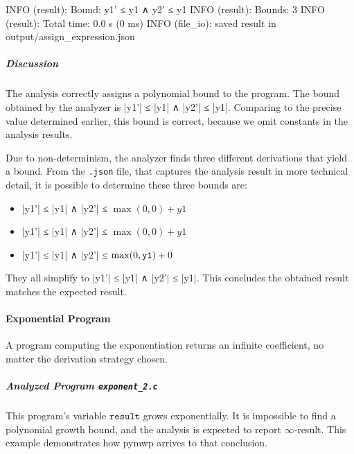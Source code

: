 \begin{outlisting}[label={lst:ex-output}]
INFO (result): Bound: y1' ≤ y1 ∧ y2' ≤ y1
INFO (result): Bounds: 3
INFO (result): Total time: 0.0 s (0 ms)
INFO (file_io): saved result in output/assign_expression.json
\end{outlisting}

\subparagraph*{Discussion}
The analysis correctly assigns a polynomial bound to the program.
The bound obtained by the analyzer is \pr|y1'| ≤ \pr|y1| ∧ \pr|y2'| ≤ \pr|y1|.
Comparing to the precise value determined earlier, this bound is correct, because we omit constants in the analysis results.

Due to non-determinism, the analyzer finds three different derivations that yield a bound.
From the \texttt{.json} file, that captures the analysis result in more technical detail, it is possible to determine these three bounds are:
\begin{itemize}
\item \pr|y1'| ≤ \pr|y1| ∧ \pr|y2'| ≤ \(\max(0,0) + y1\)
\item \pr|y1'| ≤ \pr|y1| ∧ \pr|y2'| ≤ \(\max(0,0) + y1\)
\item \pr|y1'| ≤ \pr|y1| ∧ \pr|y2'| ≤ \(\max(0,\prm{y1}) + 0\)
\end{itemize}
They all simplify to \pr|y1'| ≤ \pr|y1| ∧ \pr|y2'| ≤ \pr|y1|.
This concludes the obtained result matches the expected result.

\paragraph{Exponential Program}\label{exponential-program}
A program computing the exponentiation returns an infinite coefficient, no matter the derivation strategy chosen.

\subparagraph*{Analyzed Program \texttt{exponent\_2.c}}\mbox{}

\begin{minipage}{\textwidth}

\end{minipage}

This program's variable \(\texttt{result}\) grows exponentially.
It is impossible to find a polynomial growth bound, and the analysis is expected to report \(\infty\)-result.
This example demonstrates how pymwp arrives to that conclusion.

